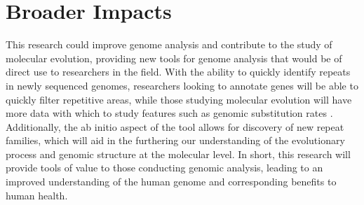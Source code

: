 \documentclass[12pt]{article}
\begin{document}
\section*{Broader Impacts}
This research could improve genome analysis and contribute to the study of molecular evolution, providing new tools for genome analysis that would be of direct use to researchers in the field.  
With the ability to quickly identify repeats in newly sequenced genomes, researchers looking to annotate genes %
will be able to quickly filter repetitive areas, while those studying molecular evolution will have more data with which to study features such as genomic substitution rates \cite{treangen2012repetitive, karro2008exponential}. 
Additionally, the ab initio aspect of the tool allows for discovery of new repeat families, which will aid in the furthering our understanding of the evolutionary process and genomic structure at the molecular level. 
In short, this research will provide tools of value to those conducting genomic analysis, leading to an improved understanding of the human genome and corresponding benefits to human health.

\begingroup
    \setlength{\bibsep}{-1pt}
    
    
\endgroup
\end{document}
